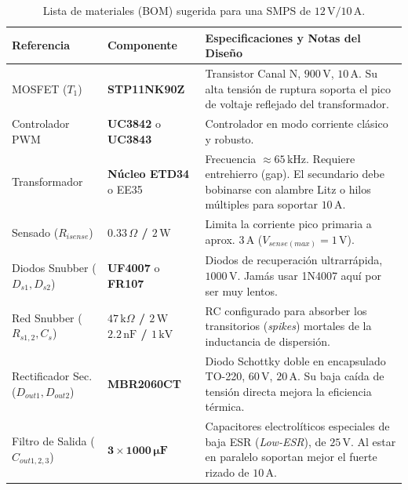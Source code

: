 \documentclass[12pt, a4paper]{article}
\begin{document}
\begin{table}[H]
    \centering
    \caption{Lista de materiales (BOM) sugerida para una SMPS de $12\,\text{V} / 10\,\text{A}$.}
    \renewcommand{\arraystretch}{1.3}
    \begin{tabular}{|p{3.5cm}|p{4.0cm}|p{7.5cm}|}
        \hline
        \textbf{Referencia} & \textbf{Componente} & \textbf{Especificaciones y Notas del Diseño} \\ \hline
        MOSFET ($T_1$) & \textbf{STP11NK90Z} & Transistor Canal N, $900\,\text{V}$, $10\,\text{A}$. Su alta tensión de ruptura soporta el pico de voltaje reflejado del transformador. \\ \hline
        Controlador PWM & \textbf{UC3842} o \textbf{UC3843} & Controlador en modo corriente clásico y robusto. \\ \hline
        Transformador & \textbf{Núcleo ETD34} o EE35 & Frecuencia $\approx 65\,\text{kHz}$. Requiere entrehierro (gap). El secundario debe bobinarse con alambre Litz o hilos múltiples para soportar $10\,\text{A}$. \\ \hline
        Sensado ($R_{isense}$) & \textbf{$0.33\,\Omega$ / $2\,\text{W}$} & Limita la corriente pico primaria a aprox. $3\,\text{A}$ ($V_{sense(max)}=1\,\text{V}$). \\ \hline
        Diodos Snubber \newline ($D_{s1}, D_{s2}$) & \textbf{UF4007} o \textbf{FR107} & Diodos de recuperación ultrarrápida, $1000\,\text{V}$. Jamás usar 1N4007 aquí por ser muy lentos. \\ \hline
        Red Snubber \newline ($R_{s1,2}, C_s$) & \textbf{$47\,\text{k}\Omega$ / $2\,\text{W}$} \newline \textbf{$2.2\,\text{nF}$ / $1\,\text{kV}$} & RC configurado para absorber los transitorios (\textit{spikes}) mortales de la inductancia de dispersión. \\ \hline
        Rectificador Sec. \newline ($D_{out1}, D_{out2}$) & \textbf{MBR2060CT} & Diodo Schottky doble en encapsulado TO-220, $60\,\text{V}$, $20\,\text{A}$. Su baja caída de tensión directa mejora la eficiencia térmica. \\ \hline
        Filtro de Salida \newline ($C_{out1,2,3}$) & $\mathbf{3 \times 1000\,\mu\text{F}}$ & Capacitores electrolíticos especiales de baja ESR (\textit{Low-ESR}), de $25\,\text{V}$. Al estar en paralelo soportan mejor el fuerte rizado de $10\,\text{A}$. \\ \hline

\end{tabular}
\end{table}
\end{document}
